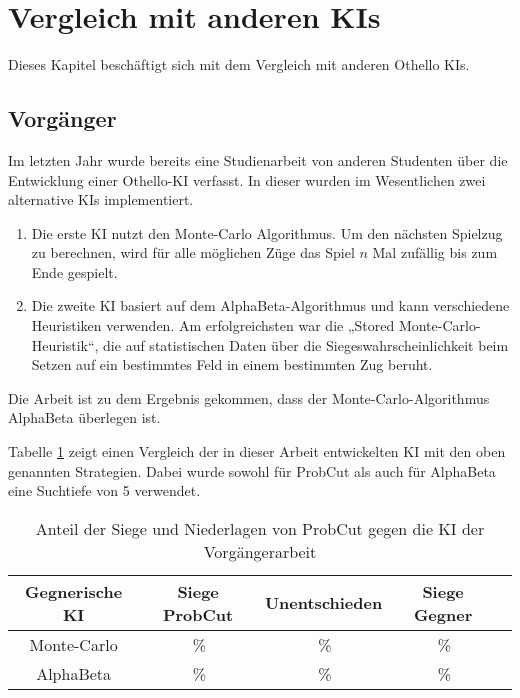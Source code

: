 
\section{Vergleich mit anderen KIs}
Dieses Kapitel beschäftigt sich mit dem Vergleich mit anderen Othello KIs.

\subsection{Vorgänger}
Im letzten Jahr wurde bereits eine Studienarbeit von anderen Studenten über die Entwicklung einer Othello-KI verfasst.
In dieser wurden im Wesentlichen zwei alternative KIs implementiert.
\begin{enumerate}
    \item Die erste KI nutzt den Monte-Carlo Algorithmus. Um den nächsten Spielzug zu berechnen, wird für alle möglichen
    Züge das Spiel $n$ Mal zufällig bis zum Ende gespielt.
    \cite[S.~19]{othellustudienarbeit}
    \item Die zweite KI basiert auf dem AlphaBeta-Algorithmus und kann verschiedene Heuristiken verwenden. Am
    erfolgreichsten war die „Stored Monte-Carlo-Heuristik“, die auf statistischen Daten über die
    Siegeswahrscheinlichkeit beim Setzen auf ein bestimmtes Feld in einem bestimmten Zug beruht.
    \cite[S.~30]{othellustudienarbeit}
\end{enumerate}
Die Arbeit ist zu dem Ergebnis gekommen, dass der Monte-Carlo-Algorithmus AlphaBeta überlegen ist.
\cite[S.~55]{othellustudienarbeit}

Tabelle \ref{table:comp:previous} zeigt einen Vergleich der in dieser Arbeit entwickelten KI mit den oben genannten Strategien. Dabei wurde sowohl für ProbCut als auch für AlphaBeta eine Suchtiefe von 5 verwendet.

\begin{table}[hb]
\centering
\begin{tabular}{c|cccc}
\hline
Gegnerische KI & Siege ProbCut & Unentschieden & Siege Gegner \\
\hline
 Monte-Carlo & \,\% &  \,\% & \,\% \\ %
 AlphaBeta   & \,\% &  \,\% & \,\% \\
\hline
\end{tabular}
\caption{Anteil der Siege und Niederlagen von ProbCut gegen die KI der Vorgängerarbeit}
\label{table:comp:previous}
\end{table}
